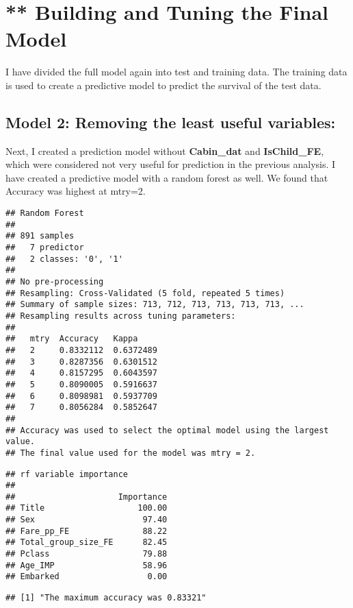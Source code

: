 \documentclass[
]{article}
\begin{document}
\hypertarget{building-and-tuning-the-final-model}{%
\section{** Building and Tuning the Final
Model}\label{building-and-tuning-the-final-model}}

I have divided the full model again into test and training data. The
training data is used to create a predictive model to predict the
survival of the test data.

\hypertarget{model-2-removing-the-least-useful-variables}{%
\subsection{\texorpdfstring{\textbf{Model 2: Removing the least useful
variables:}}{Model 2: Removing the least useful variables:}}\label{model-2-removing-the-least-useful-variables}}

Next, I created a prediction model without \textbf{Cabin\_dat} and
\textbf{IsChild\_FE}, which were considered not very useful for
prediction in the previous analysis. I have created a predictive model
with a random forest as well. We found that Accuracy was highest at
mtry=2.

\begin{verbatim}
## Random Forest 
## 
## 891 samples
##   7 predictor
##   2 classes: '0', '1' 
## 
## No pre-processing
## Resampling: Cross-Validated (5 fold, repeated 5 times) 
## Summary of sample sizes: 713, 712, 713, 713, 713, 713, ... 
## Resampling results across tuning parameters:
## 
##   mtry  Accuracy   Kappa    
##   2     0.8332112  0.6372489
##   3     0.8287356  0.6301512
##   4     0.8157295  0.6043597
##   5     0.8090005  0.5916637
##   6     0.8098981  0.5937709
##   7     0.8056284  0.5852647
## 
## Accuracy was used to select the optimal model using the largest value.
## The final value used for the model was mtry = 2.
\end{verbatim}

\begin{verbatim}
## rf variable importance
## 
##                     Importance
## Title                   100.00
## Sex                      97.40
## Fare_pp_FE               88.22
## Total_group_size_FE      82.45
## Pclass                   79.88
## Age_IMP                  58.96
## Embarked                  0.00
\end{verbatim}

\begin{verbatim}
## [1] "The maximum accuracy was 0.83321"
\end{verbatim}
\end{document}
